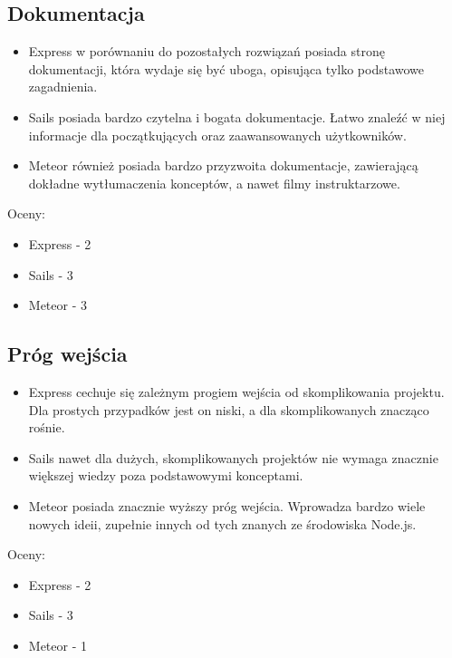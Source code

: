 \documentclass[12pt]{report}
\begin{document}
    \subsection{Dokumentacja}
      \begin{itemize}
        \item Express w porównaniu do pozostałych rozwiązań posiada stronę dokumentacji, która wydaje się być uboga, opisująca tylko podstawowe zagadnienia.
        \item Sails posiada bardzo czytelna i bogata dokumentacje. Łatwo znaleźć w niej informacje dla początkujących oraz zaawansowanych użytkowników.
        \item Meteor również posiada bardzo przyzwoita dokumentacje, zawierającą dokładne wytłumaczenia konceptów, a nawet filmy instruktarzowe.
      \end{itemize}
      Oceny:
      \begin{itemize}
        \item Express - 2
        \item Sails - 3
        \item Meteor - 3
      \end{itemize}
      
    \subsection{Próg wejścia}
      \begin{itemize}
        \item Express cechuje się zależnym progiem wejścia od skomplikowania projektu. Dla prostych przypadków jest on niski, a dla skomplikowanych znacząco rośnie.
        \item Sails nawet dla dużych, skomplikowanych projektów nie wymaga znacznie większej wiedzy poza podstawowymi konceptami. 
        \item Meteor posiada znacznie wyższy próg wejścia. Wprowadza bardzo wiele nowych ideii, zupełnie innych od tych znanych ze środowiska Node.js.
      \end{itemize}
      Oceny:
      \begin{itemize}
        \item Express - 2
        \item Sails - 3
        \item Meteor - 1
      \end{itemize}
      
\end{document}

